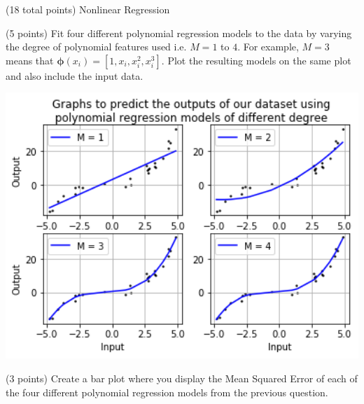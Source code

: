 \documentclass[12pt]{article}
\begin{document}
\begin{question}{(18 total points) Nonlinear Regression}





%
%
\begin{subquestion}{(5 points) Fit four different polynomial regression models to the data  by varying the degree of polynomial features used i.e. $M = 1$ to $4$.
For example, $M=3$ means that $\boldsymbol{\phi}(x_i) = [1, x_i, x_i^2, x_i^3]$.
Plot the resulting models on the same plot and also include the input data.\\
}


\begin{answerbox}{35em}
\includegraphics [width=1\textwidth]{images/q2a-graph.png}
\end{answerbox}



\end{subquestion}


%
%
\begin{subquestion}{(3 points) Create a bar plot where you display the Mean Squared Error of each of the four different polynomial regression models from the previous question.}



\end{subquestion}
\end{question}
\end{document}
